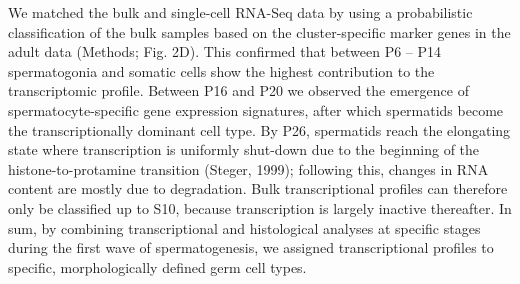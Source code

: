 We matched the bulk and single-cell RNA-Seq data by using a probabilistic classification of the bulk samples based on the cluster-specific marker genes in the adult data (Methods; Fig. 2D). This confirmed that between P6 – P14 spermatogonia and somatic cells show the highest contribution to the transcriptomic profile. Between P16 and P20 we observed the emergence of spermatocyte-specific gene expression signatures, after which spermatids become the transcriptionally dominant cell type. By P26, spermatids reach the elongating state where transcription is uniformly shut-down due to the beginning of the histone-to-protamine transition (Steger, 1999); following this, changes in RNA content are mostly due to degradation. Bulk transcriptional profiles can therefore only be classified up to S10, because transcription is largely inactive thereafter.
In sum, by combining transcriptional and histological analyses at specific stages during the first wave of spermatogenesis, we assigned transcriptional profiles to specific, morphologically defined germ cell types.





